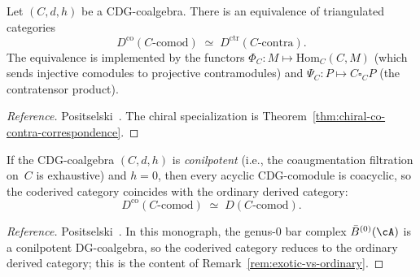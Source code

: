 \begin{theorem}
\label{thm:co-contra-correspondence-appendix}
Let $(C, d, h)$ be a CDG-coalgebra.  There is an equivalence of
triangulated categories
\begin{equation}\label{eq:co-contra-equivalence}
D^{\mathrm{co}}(C\text{-}\mathrm{comod})
\;\simeq\;
D^{\mathrm{ctr}}(C\text{-}\mathrm{contra}).
\end{equation}
The equivalence is implemented by the functors
$\Phi_C \colon M \mapsto \mathrm{Hom}_C(C, M)$ \textup{(}which
sends injective comodules to projective contramodules\textup{)}
and $\Psi_C \colon P \mapsto C \square_C P$ \textup{(}the
contratensor product\textup{)}.
\end{theorem}

\begin{proof}[Reference]
Positselski~\cite[Theorem~5.3]{Positselski11}.  The chiral
specialization is Theorem~\ref{thm:chiral-co-contra-correspondence}.
\end{proof}

\begin{theorem}
\label{thm:conilpotent-reduction}
If the CDG-coalgebra $(C, d, h)$ is \emph{conilpotent}
\textup{(}i.e., the coaugmentation filtration on~$C$ is
exhaustive\textup{)} and $h = 0$, then every acyclic
CDG-comodule is coacyclic, so the coderived category coincides
with the ordinary derived category:
\begin{equation}\label{eq:conilpotent-reduction}
D^{\mathrm{co}}(C\text{-}\mathrm{comod})
\;\simeq\;
D(C\text{-}\mathrm{comod}).
\end{equation}
\end{theorem}

\begin{proof}[Reference]
Positselski~\cite[Corollary~4.4]{Positselski11}.  In this
monograph, the genus-$0$ bar complex
$\bar{B}^{(0)}(\cA)$ is a conilpotent DG-coalgebra, so
the coderived category reduces to the ordinary derived
category; this is the content of
Remark~\textup{\ref{rem:exotic-vs-ordinary}}.
\end{proof}

